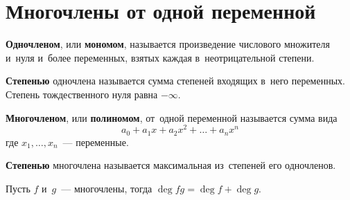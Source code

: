\section{Многочлены от одной переменной}
\textbf{Одночленом}, или \textbf{мономом}, называется произведение числового множителя и~нуля и~более переменных, взятых каждая в~неотрицательной степени.

\textbf{Степенью} одночлена называется сумма степеней входящих в~него переменных. Степень тождественного нуля равна $-\infty$.

\textbf{Многочленом}, или \textbf{полиномом}, от~одной переменной называется сумма вида
\begin{equation*}
a_0 + a_1 x + a_2 x^2 + \ldots + a_n x^n
\end{equation*}
где $x_1, \ldots, x_n$~--- переменные.

\textbf{Степенью} многочлена называется максимальная из~степеней его одночленов.

\begin{lemma}
Пусть $f$ и~$g$~--- многочлены, тогда $\deg fg = \deg f + \deg g$.
\end{lemma}




